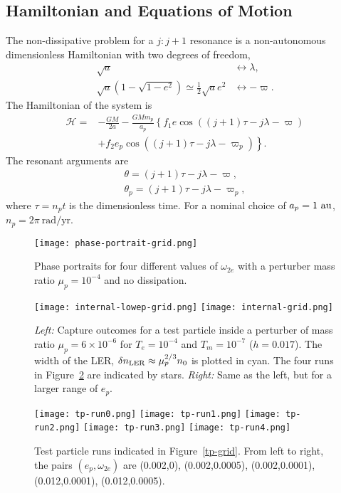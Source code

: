 \documentclass[usenatbib,twocolumn]{mnras}
\begin{document}
\subsection{Hamiltonian and Equations of Motion}
The non-dissipative problem for a $j:j+1$ resonance is a non-autonomous dimensionless Hamiltonian with two degrees of freedom,
\begin{align}
    \sqrt{a} &\longleftrightarrow \lambda,\\
    \sqrt{a}(1-\sqrt{1-e^2})\simeq \frac12\sqrt{a}e^2&\longleftrightarrow -\varpi.
\end{align}
The Hamiltonian of the system is 
\begin{align}
    \label{eq:TPH}
    \mathcal H=&-\frac{GM}{2a}
    -\frac{GMm_p}{a_p}\left\{
        f_1e\cos((j+1)\tau-j\lambda-\varpi)\right.\\
        &\left. +f_2e_p\cos((j+1)\tau-j\lambda-\varpi_p)
    \right\}.\nonumber
\end{align}
The resonant arguments are 
\begin{align}
    \theta=(j+1)\tau -j\lambda-\varpi,\\
    \theta_p=(j+1)\tau -j\lambda-\varpi_p,
\end{align}
where $\tau=n_p t$ is the dimensionless time. For a nominal choice of $a_p=1~\rm{au}$, $n_p = 2\pi~\mathrm{rad}/\mathrm{yr}$.

\begin{figure*}
    \texttt{[image: phase-portrait-grid.png]}
  \caption{Phase portraits for four different values of $\omega_{2e}$ with a perturber mass ratio $\mu_p=10^{-4}$ and no dissipation.}
\end{figure*}

\begin{figure*}
    \texttt{[image: internal-lowep-grid.png]}
    \texttt{[image: internal-grid.png]}
    \caption{\emph{Left:} Capture outcomes for a test particle inside a perturber of mass ratio $\mu_p=6\times10^{-6}$ for $T_e=10^{-4}$ and $T_m=10^{-7}$ ($h=0.017$). The width of the LER, $\delta n_{\rm LER}\approx \mu_p^{2/3} n_0$ is plotted in cyan. The four runs in Figure~\ref{fig:tp-runs} are indicated by stars.
    \emph{Right:} Same as the left, but for a larger range of $e_p$.}
    \label{fig:tp-grid}
\end{figure*}

\begin{figure*}
    \texttt{[image: tp-run0.png]}
    \texttt{[image: tp-run1.png]}
    \texttt{[image: tp-run2.png]}
    \texttt{[image: tp-run3.png]}
    \texttt{[image: tp-run4.png]}
    \caption{Test particle runs indicated in Figure~\ref{tp-grid}. From left to right, the pairs $(e_p,\omega_{2e})$ are (0.002,0), (0.002,0.0005), (0.002,0.0001), (0.012,0.0001), (0.012,0.0005). }
    \label{fig:tp-runs}
\end{figure*}
\end{document}
